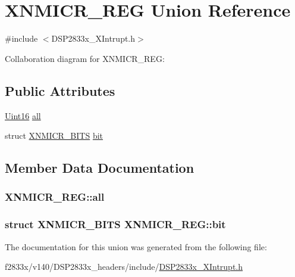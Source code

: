 \hypertarget{union_x_n_m_i_c_r___r_e_g}{}\section{X\+N\+M\+I\+C\+R\+\_\+\+R\+E\+G Union Reference}
\label{union_x_n_m_i_c_r___r_e_g}


{\ttfamily \#include $<$D\+S\+P2833x\+\_\+\+X\+Intrupt.\+h$>$}



Collaboration diagram for X\+N\+M\+I\+C\+R\+\_\+\+R\+E\+G\+:
\subsection*{Public Attributes}
\begin{DoxyCompactItemize}
\item 
\hyperlink{_d_s_p2833x___device_8h_a59a9f6be4562c327cbfb4f7e8e18f08b}{Uint16} \hyperlink{union_x_n_m_i_c_r___r_e_g_a7bdb1e7e62e56cd09b24d88cddc92f3a}{all}
\item 
struct \hyperlink{struct_x_n_m_i_c_r___b_i_t_s}{X\+N\+M\+I\+C\+R\+\_\+\+B\+I\+T\+S} \hyperlink{union_x_n_m_i_c_r___r_e_g_a55ecbd74e480b69551f96713743255ae}{bit}
\end{DoxyCompactItemize}


\subsection{Member Data Documentation}
\hypertarget{union_x_n_m_i_c_r___r_e_g_a7bdb1e7e62e56cd09b24d88cddc92f3a}{}
\subsubsection[{all}]{ X\+N\+M\+I\+C\+R\+\_\+\+R\+E\+G\+::all}\label{union_x_n_m_i_c_r___r_e_g_a7bdb1e7e62e56cd09b24d88cddc92f3a}
\hypertarget{union_x_n_m_i_c_r___r_e_g_a55ecbd74e480b69551f96713743255ae}{}
\subsubsection[{bit}]{\setlength{\rightskip}{0pt plus 5cm}struct {\bf X\+N\+M\+I\+C\+R\+\_\+\+B\+I\+T\+S} X\+N\+M\+I\+C\+R\+\_\+\+R\+E\+G\+::bit}\label{union_x_n_m_i_c_r___r_e_g_a55ecbd74e480b69551f96713743255ae}


The documentation for this union was generated from the following file\+:\begin{DoxyCompactItemize}
\item 
f2833x/v140/\+D\+S\+P2833x\+\_\+headers/include/\hyperlink{_d_s_p2833x___x_intrupt_8h}{D\+S\+P2833x\+\_\+\+X\+Intrupt.\+h}\end{DoxyCompactItemize}
